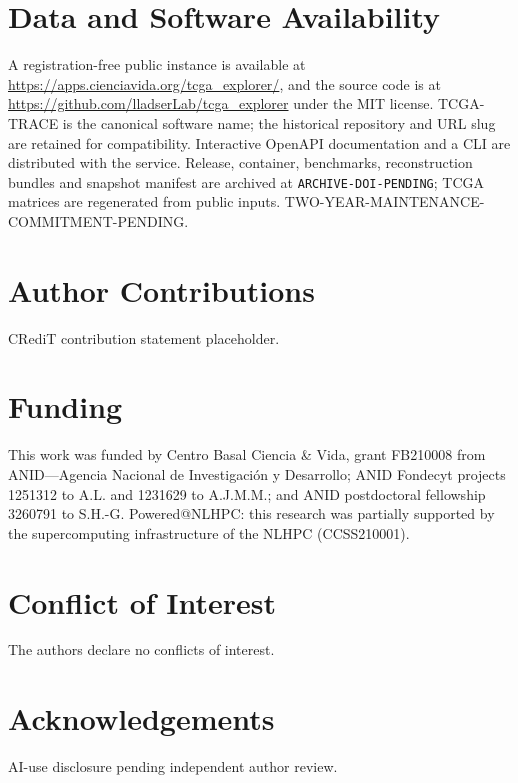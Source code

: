 \documentclass[12pt]{article}
\begin{document}
\section*{Data and Software Availability}

A registration-free public instance is available at
\url{https://apps.cienciavida.org/tcga_explorer/}, and the source code is
at \url{https://github.com/lladserLab/tcga_explorer} under the MIT license.
TCGA-TRACE is the canonical software name; the historical repository and URL
slug are retained for compatibility. Interactive OpenAPI documentation and a
CLI are distributed with the service. Release, container, benchmarks,
reconstruction bundles and snapshot manifest are archived at
\texttt{ARCHIVE-DOI-PENDING}; TCGA matrices are regenerated from public inputs.
TWO-YEAR-MAINTENANCE-COMMITMENT-PENDING.

\section*{Author Contributions}

CRediT contribution statement placeholder.

\section*{Funding}

This work was funded by Centro Basal Ciencia \& Vida, grant FB210008 from
ANID---Agencia Nacional de Investigación y Desarrollo; ANID Fondecyt projects
1251312 to A.L. and 1231629 to A.J.M.M.; and ANID postdoctoral fellowship
3260791 to S.H.-G. Powered@NLHPC: this research was partially supported by the
supercomputing infrastructure of the NLHPC (CCSS210001).

\section*{Conflict of Interest}

The authors declare no conflicts of interest.

\section*{Acknowledgements}

AI-use disclosure pending independent author review.



\end{document}
